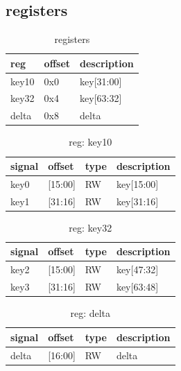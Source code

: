 \documentclass[10pt]{article}
\begin{document}
\subsection{registers}

\begin{table}[H]
\begin{tabular}[width=\textwidth]{|l|l|l|}
\hline
reg                        &offset	 &description \\
\hline
key10                      &0x0      &key[31:00]  \\
key32                      &0x4      &key[63:32]  \\
delta                      &0x8      &delta       \\
\hline
\end{tabular}
\label{t1}
\caption{registers}
\end{table}

\begin{table}[H]
\begin{tabular}[width=\textwidth]{|l|l|l|l|}
\hline
signal        &offset   &type &description   \\
\hline
key0           &[15:00]    &RW   &key[15:00] \\
key1           &[31:16]    &RW   &key[31:16] \\
\hline
\end{tabular}
\label{t1}
\caption{reg: key10}
\end{table}

\begin{table}[H]
\begin{tabular}[width=\textwidth]{|l|l|l|l|}
\hline
signal        &offset   &type &description   \\
\hline
key2           &[15:00]    &RW   &key[47:32] \\
key3           &[31:16]    &RW   &key[63:48] \\
\hline
\end{tabular}
\label{t1}
\caption{reg: key32}
\end{table}


\begin{table}[H]
\begin{tabular}[width=\textwidth]{|l|l|l|l|}
\hline
signal        &offset   &type &description \\
\hline
delta         &[16:00]   &RW   &delta \\
\hline
\end{tabular}
\label{t1}
\caption{reg: delta}
\end{table}
\end{document}
